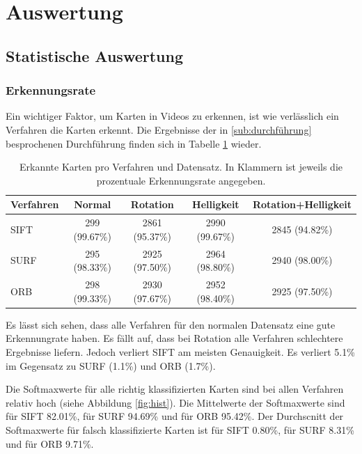\section{Auswertung}\raggedbottom 
\label{sec:auswertung}

\subsection{Statistische Auswertung}

\subsubsection{Erkennungsrate}
\label{sub:erkennungsrate}

Ein wichtiger Faktor, um Karten in Videos zu erkennen, ist wie verlässlich ein Verfahren die Karten erkennt. Die Ergebnisse der in \ref{sub:durchführung} besprochenen Durchführung finden sich in Tabelle \ref{table:result} wieder.

\begin{table}
\centering
	\begin{tabular}{  l c c c c  }
	  Verfahren & Normal & Rotation & Helligkeit & Rotation+Helligkeit \\
	  \midrule
	  SIFT & 299 (99.67\%) & 2861 (95.37\%) & 2990 (99.67\%) & 2845 (94.82\%) \\
	  SURF & 295 (98.33\%) & 2925 (97.50\%) & 2964 (98.80\%) & 2940 (98.00\%) \\ 
	  ORB & 298  (99.33\%) & 2930 (97.67\%) & 2952 (98.40\%) & 2925 (97.50\%) \\
	\end{tabular}

\caption{Erkannte Karten pro Verfahren und Datensatz. In Klammern ist jeweils die prozentuale Erkennungsrate angegeben.}
\label{table:result}
\end{table}

Es lässt sich sehen, dass alle Verfahren für den normalen Datensatz eine gute Erkennungrate haben.
Es fällt auf, dass bei Rotation alle Verfahren schlechtere Ergebnisse liefern. Jedoch verliert SIFT am meisten Genauigkeit. Es verliert 5.1\% im Gegensatz zu SURF (1.1\%) und ORB (1.7\%).

Die Softmaxwerte für alle richtig klassifizierten Karten sind bei allen Verfahren relativ hoch (siehe Abbildung \ref{fig:hist}). Die Mittelwerte der Softmaxwerte sind für SIFT 82.01\%, für SURF 94.69\% und für ORB 95.42\%.
Der Durchscnitt der Softmaxwerte für falsch klassifizierte Karten ist für SIFT 0.80\%, für SURF 8.31\% und für ORB 9.71\%. 


